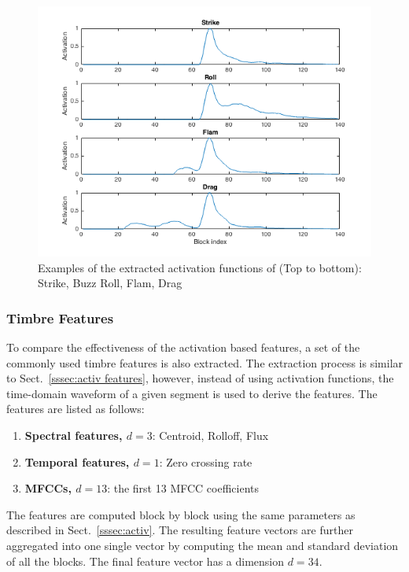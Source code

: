 \documentclass{article}
\begin{document}
{{{{{{{{{ %
\begin{figure}
\centering
\includegraphics[width = 8 cm]{./figures/activ_all.png}
\caption{Examples of the extracted activation functions of (Top to bottom): Strike, Buzz Roll, Flam, Drag}
\label{fig:atvall}
\end{figure}

\subsubsection{Timbre Features}
\label{sssec:timbre features}
To compare the effectiveness of the activation based features, a set of the commonly used timbre features is also extracted. The extraction process is similar to Sect.~\ref{sssec:activ features}, however, instead of using activation functions, the time-domain waveform of a given segment is used to derive the features. The features are listed as follows: 

\begin{enumerate}
	\item \textbf{Spectral features, $d = 3$}: Centroid, Rolloff, Flux
	\item \textbf{Temporal features, $d = 1$}: Zero crossing rate
	\item \textbf{MFCCs, $d = 13$}: the first 13 MFCC coefficients
\end{enumerate}

The features are computed block by block using the same parameters as described in Sect.~\ref{sssec:activ}. The resulting feature vectors are further aggregated into one single vector by computing the mean and standard deviation of all the blocks. The final feature vector has a dimension $d = 34$. 

}}}}}}}}}
\end{document}
